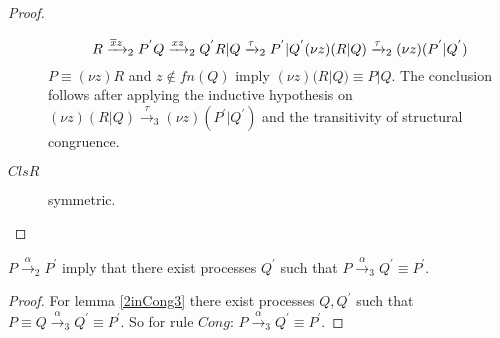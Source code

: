 \begin{lemma}
\begin{proof}
\begin{description}
\[{{			R \xrightarrow{\overline{x}z}_{2} P^{'}
		      \\
			Q \xrightarrow{xz}_{2} Q^{'}
		    }{
		      R|Q \xrightarrow{\tau}_{2} P^{'}|Q^{'}
		    }
		  }{
		    (\nu z)(R|Q) \xrightarrow{\tau}_{2} (\nu z)(P^{'}|Q^{'})
		  }
		\]
		$P \equiv (\nu z)R$ and $z \notin fn(Q)$ imply $(\nu z)(R|Q) \equiv P|Q$. The conclusion follows after applying the inductive hypothesis on $(\nu z)(R|Q) \xrightarrow{\tau}_{3} (\nu z)(P^{'}|Q^{'})$ and the transitivity of structural congruence.
      \item[$ClsR$] symmetric.
    \end{description}
  \end{proof}
\end{lemma}

\begin{theorem}
  $P\xrightarrow{\alpha}_{2} P^{'}$ imply that there exist processes $Q^{'}$ such that  $P \xrightarrow{\alpha}_{3} Q^{'} \equiv P^{'}$.
  \begin{proof}
    For lemma \ref{2inCong3} there exist processes $Q, Q^{'}$ such that $P \equiv Q \xrightarrow{\alpha}_{3} Q^{'} \equiv P^{'}$. So for rule $Cong$: $P \xrightarrow{\alpha}_{3} Q^{'} \equiv P^{'}$.
  \end{proof}
\end{theorem}




